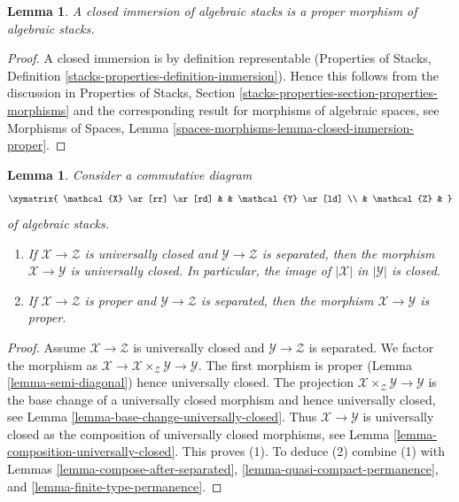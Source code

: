 \documentclass{stacks-project}
\theoremstyle{plain}
\newtheorem{lemma}[subsection]{Lemma}
\theoremstyle{definition}
\theoremstyle{remark}
\numberwithin{equation}{subsection}
\begin{document}
\begin{lemma}
\label{lemma-closed-immersion-proper}
A closed immersion of algebraic stacks is a proper morphism of
algebraic stacks.
\end{lemma}

\begin{proof}
A closed immersion is by definition representable
(Properties of Stacks, Definition
\ref{stacks-properties-definition-immersion}).
Hence this follows from the discussion in
Properties of Stacks, Section
\ref{stacks-properties-section-properties-morphisms}
and the corresponding result for morphisms of algebraic spaces, see
Morphisms of Spaces, Lemma
\ref{spaces-morphisms-lemma-closed-immersion-proper}.
\end{proof}

\begin{lemma}
\label{lemma-universally-closed-permanence}
Consider a commutative diagram
$$
\xymatrix{
\mathcal{X} \ar[rr] \ar[rd] & &
\mathcal{Y} \ar[ld] \\
& \mathcal{Z} &
}
$$
of algebraic stacks.
\begin{enumerate}
\item If $\mathcal{X} \to \mathcal{Z}$ is universally closed and
$\mathcal{Y} \to \mathcal{Z}$ is separated,
then the morphism $\mathcal{X} \to \mathcal{Y}$ is universally closed.
In particular, the image of $|\mathcal{X}|$ in $|\mathcal{Y}|$ is closed.
\item If $\mathcal{X} \to \mathcal{Z}$ is proper and
$\mathcal{Y} \to \mathcal{Z}$ is separated, then
the morphism $\mathcal{X} \to \mathcal{Y}$ is proper.
\end{enumerate}
\end{lemma}

\begin{proof}
Assume $\mathcal{X} \to \mathcal{Z}$ is universally closed and
$\mathcal{Y} \to \mathcal{Z}$ is separated.
We factor the morphism as
$\mathcal{X} \to \mathcal{X} \times_\mathcal{Z} \mathcal{Y} \to \mathcal{Y}$.
The first morphism is proper (Lemma \ref{lemma-semi-diagonal})
hence universally closed.
The projection $\mathcal{X} \times_\mathcal{Z} \mathcal{Y} \to \mathcal{Y}$
is the base change of a universally closed morphism and hence
universally closed, see
Lemma \ref{lemma-base-change-universally-closed}.
Thus $\mathcal{X} \to \mathcal{Y}$ is universally closed as the composition
of universally closed morphisms, see
Lemma \ref{lemma-composition-universally-closed}.
This proves (1). To deduce (2) combine (1) with
Lemmas \ref{lemma-compose-after-separated},
\ref{lemma-quasi-compact-permanence}, and
\ref{lemma-finite-type-permanence}.
\end{proof}
\end{document}
